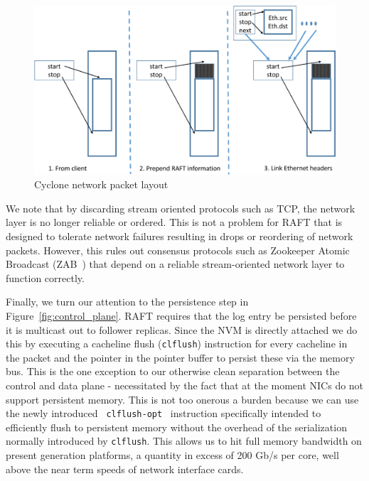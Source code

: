 \documentclass[10pt, preprint, nonatbib]{sigplanconf}
\begin{document}
\begin{figure}
  \centering
  \includegraphics[scale=0.3]{figures2/network_packet.pdf}
  \caption{Cyclone network packet layout}
  \label{fig:packet_layout}
\end{figure}

We note that by discarding stream oriented protocols such as TCP, the network
layer is no longer reliable or ordered. This is not a problem for RAFT that is
designed to tolerate network failures resulting in drops or reordering of
network packets. However, this rules out consensus protocols such as Zookeeper
Atomic Broadcast (ZAB~\cite{zab}) that depend on a reliable stream-oriented
network layer to function correctly.

Finally, we turn our attention to the persistence step in
Figure~\ref{fig:control_plane}. RAFT requires that the log entry be persisted
before it is multicast out to follower replicas. Since the NVM is directly
attached we do this by executing a cacheline flush ({\tt clflush}) instruction
for every cacheline in the packet and the pointer in the pointer buffer to
persist these via the memory bus. This is the one exception to our otherwise
clean separation between the control and data plane - necessitated by the fact
that at the moment NICs do not support persistent memory. This is not too
onerous a burden because we can use the newly introduced {\tt
  clflush-opt}~\cite{clflush_opt} instruction specifically intended to
efficiently flush to persistent memory without the overhead of the serialization
normally introduced by {\tt clflush}. This allows us to hit full memory
bandwidth on present generation platforms, a quantity in excess of 200 Gb/s per
core, well above the near term speeds of network interface cards.
\end{document}
